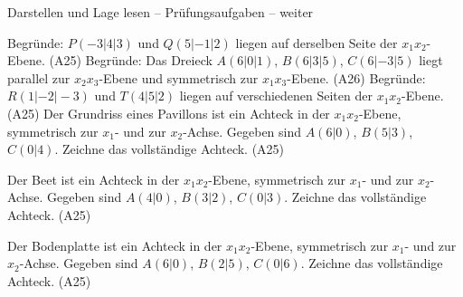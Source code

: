 \begin{aufgabe}{Darstellen und Lage lesen – Prüfungsaufgaben – weiter}
\begin{teile}
\teil Begründe: $P(-3 | 4 | 3)$ und $Q(5 | -1 | 2)$ liegen auf derselben Seite der $x_1x_2$-Ebene. \hfill (A25)
\teil Begründe: Das Dreieck $A(6 | 0 | 1)$, $B(6 | 3 | 5)$, $C(6 | -3 | 5)$ liegt parallel zur $x_2x_3$-Ebene und symmetrisch zur $x_1x_3$-Ebene. \hfill (A26)
\teil Begründe: $R(1 | -2 | -3)$ und $T(4 | 5 | 2)$ liegen auf verschiedenen Seiten der $x_1x_2$-Ebene. \hfill (A25)
\teil Der Grundriss eines Pavillons ist ein Achteck in der $x_1x_2$-Ebene, symmetrisch zur $x_1$- und zur $x_2$-Achse. Gegeben sind $A(6 | 0)$, $B(5 | 3)$, $C(0 | 4)$. Zeichne das vollständige Achteck. \hfill (A25)

\begin{ksys}[xmin=-7,xmax=7,ymin=-7,ymax=7,xlabel=$x_1$,ylabel=$x_2$]    \end{ksys}
\teil Der Beet ist ein Achteck in der $x_1x_2$-Ebene, symmetrisch zur $x_1$- und zur $x_2$-Achse. Gegeben sind $A(4 | 0)$, $B(3 | 2)$, $C(0 | 3)$. Zeichne das vollständige Achteck. \hfill (A25)

\begin{ksys}[xmin=-7,xmax=7,ymin=-7,ymax=7,xlabel=$x_1$,ylabel=$x_2$]    \end{ksys}
\teil Der Bodenplatte ist ein Achteck in der $x_1x_2$-Ebene, symmetrisch zur $x_1$- und zur $x_2$-Achse. Gegeben sind $A(6 | 0)$, $B(2 | 5)$, $C(0 | 6)$. Zeichne das vollständige Achteck. \hfill (A25)

\begin{ksys}[xmin=-7,xmax=7,ymin=-7,ymax=7,xlabel=$x_1$,ylabel=$x_2$]    \end{ksys}
\end{teile}
\end{aufgabe}

